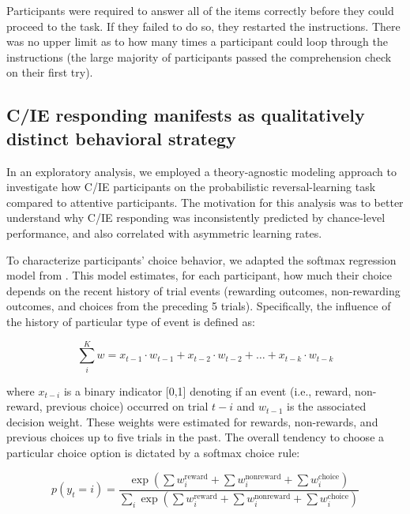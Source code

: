 \documentclass[a4paper,notitlepage,12pt]{article}
\begin{document}
\begin{refsection}[supp]
Participants were required to answer all of the items correctly before they could proceed to the task. If they failed to do so, they restarted the instructions. There was no upper limit as to how many times a participant could loop through the instructions (the large majority of participants passed the comprehension check on their first try).

\subsection*{C/IE responding manifests as qualitatively distinct behavioral strategy}

In an exploratory analysis, we employed a theory-agnostic modeling approach to investigate how C/IE participants on the probabilistic reversal-learning task compared to attentive participants. The motivation for this analysis was to better understand why C/IE responding was inconsistently predicted by chance-level performance, and also correlated with asymmetric learning rates.  

To characterize participants' choice behavior, we adapted the softmax regression model from \cite{seymour2012serotonin}. This model estimates, for each participant, how much their choice depends on the recent history of trial events (rewarding outcomes, non-rewarding outcomes, and choices from the preceding 5 trials). Specifically, the influence of the history of particular type of event is defined as:

\begin{equation*}
    \sum_i^K w = x_{t-1} \cdot w_{t-1} + x_{t-2} \cdot w_{t-2} +  \ldots + x_{t-k} \cdot w_{t-k}
\end{equation*}

where $x_{t-i}$ is a binary indicator [0,1] denoting if an event (i.e., reward, non-reward, previous choice) occurred on trial $t-i$ and $w_{t-1}$ is the associated decision weight. These weights were estimated for rewards, non-rewards, and previous choices up to five trials in the past. The overall tendency to choose a particular choice option is dictated by a softmax choice rule:

\begin{equation*}
    p(y_t = i) = \frac{ \exp \left( \sum w_i^\text{reward} + \sum w_i^\text{nonreward} + \sum w_i^\text{choice} \right) }{ \sum_i \exp \left( \sum w_i^\text{reward} + \sum w_i^\text{nonreward} + \sum w_i^\text{choice} \right) }
\end{equation*}


\end{refsection}
\end{document}
